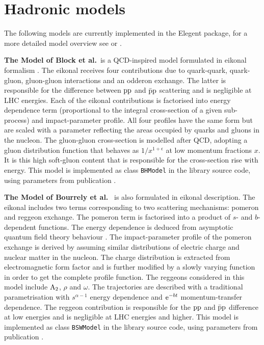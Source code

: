 \documentclass[preprint,12pt]{elsarticle}
\def\class#1{{\tt #1}}
\def\e{{\rm e}}
\begin{document}
\section{Hadronic models}\label{s:had mod}

The following models are currently implemented in the Elegent package, for a more detailed model overview see \cite[section 1.1]{jan_thesis} or \cite[section 4]{dremin13}.

{\bf The Model of Block et al.}~is a QCD-inspired model formulated in eikonal formalism \cite{bh99,block06}. The eikonal receives four contributions due to quark-quark, quark-gluon, gluon-gluon interactions and an odderon exchange. The latter is responsible for the difference between $\rm pp$ and $\rm \bar p p$ scattering and is negligible at LHC energies. Each of the eikonal contributions is factorised into energy dependence term (proportional to the integral cross-section of a given sub-process) and impact-parameter profile. All four profiles have the same form but are scaled with a parameter reflecting the areas occupied by quarks and gluons in the nucleon. The gluon-gluon cross-section is modelled after QCD, adopting a gluon distribution function that behaves as $1/x^{1+\epsilon}$ at low momentum fractions $x$. It is this high soft-gluon content that is responsible for the cross-section rise with energy. This model is implemented as class \class{BHModel} in the library source code, using parameters from publication \cite{block06}.


{\bf The Model of Bourrely et al.}~\cite{bsw79,bsw84,bsw03,bsw11} is also formulated in eikonal description. The eikonal includes two terms corresponding to two scattering mechanisms: pomeron and reggeon exchange. The pomeron term is factorised into a product of $s$- and $b$-dependent functions. The energy dependence is deduced from asymptotic quantum field theory behaviour \cite{wu70}. The impact-parameter profile of the pomeron exchange is derived by assuming similar distributions of electric charge and nuclear matter in the nucleon. The charge distribution is extracted from electromagnetic form factor and is further modified by a slowly varying function in order to get the complete profile function. The reggeons considered in this model include $\rm A_2$, $\rho$ and $\omega$. The trajectories are described with a traditional parametrisation with $s^{\alpha - 1}$ energy dependence and $\e^{-bt}$ momentum-transfer dependence. The reggeon contribution is responsible for the $\rm pp$ and $\rm \bar pp$ difference at low energies and is negligible at LHC energies and higher. This model is implemented as class \class{BSWModel} in the library source code, using parameters from publication \cite{bsw03}.
\end{document}
